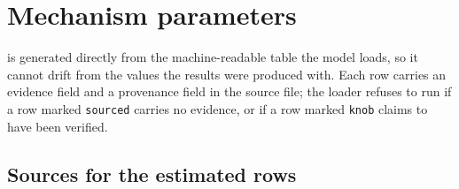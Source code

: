 \section{Mechanism parameters}
\label{app:parameters}

 is generated directly from the machine-readable table the
model loads, so it cannot drift from the values the results were produced with.
Each row carries an evidence field and a provenance field in the source file; the
loader refuses to run if a row marked \texttt{sourced} carries no evidence, or if
a row marked \texttt{knob} claims to have been verified.

\begin{table}[h]
\centering
\footnotesize

\caption{All \MechanismParameterCount{} mechanism parameters. Of these,
\MechanismSourcedCount{} are estimated from published sources and checked against
them, and \MechanismKnobCount{} are scenario knobs with no independent support.
The range column is propagated through the parameter ensemble of
 and the boundary grid of ; it is a stated
plausible interval across settings, not a confidence interval from a single
study.}
\label{tab:parameters}
\end{table}

\subsection*{Sources for the estimated rows}

